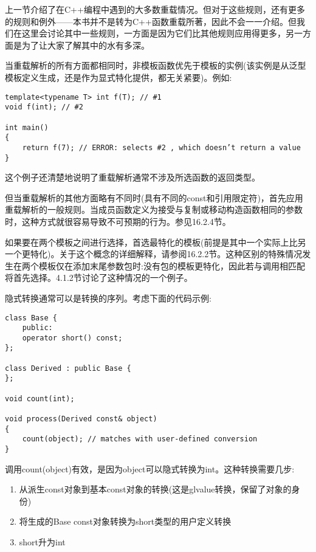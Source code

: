 
上一节介绍了在C++编程中遇到的大多数重载情况。但对于这些规则，还有更多的规则和例外——本书并不是转为C++函数重载所著，因此不会一一介绍。但我们在这里会讨论其中一些规则，一方面是因为它们比其他规则应用得更多，另一方面是为了让大家了解其中的水有多深。


当重载解析的所有方面都相同时，非模板函数优先于模板的实例(该实例是从泛型模板定义生成，还是作为显式特化提供，都无关紧要)。例如:

\begin{lstlisting}[style=styleCXX]
template<typename T> int f(T); // #1
void f(int); // #2

int main()
{
	return f(7); // ERROR: selects #2 , which doesn’t return a value
}
\end{lstlisting}

这个例子还清楚地说明了重载解析通常不涉及所选函数的返回类型。

但当重载解析的其他方面略有不同时(具有不同的const和引用限定符)，首先应用重载解析的一般规则。当成员函数定义为接受与复制或移动构造函数相同的参数时，这种方式就很容易导致不可预期的行为。参见16.2.4节。

如果要在两个模板之间进行选择，首选最特化的模板(前提是其中一个实际上比另一个更特化)。关于这个概念的详细解释，请参阅16.2.2节。这种区别的特殊情况发生在两个模板仅在添加末尾参数包时:没有包的模板更特化，因此若与调用相匹配将首先选择。4.1.2节讨论了这种情况的一个例子。


隐式转换通常可以是转换的序列。考虑下面的代码示例:

\begin{lstlisting}[style=styleCXX]
class Base {
	public:
	operator short() const;
};

class Derived : public Base {
};

void count(int);

void process(Derived const& object)
{
	count(object); // matches with user-defined conversion
}
\end{lstlisting}

调用count(object)有效，是因为object可以隐式转换为int。这种转换需要几步:

\begin{enumerate}
\item 
从派生const对象到基本const对象的转换(这是glvalue转换，保留了对象的身份)

\item 
将生成的Base const对象转换为short类型的用户定义转换

\item 
short升为int
\end{enumerate}

